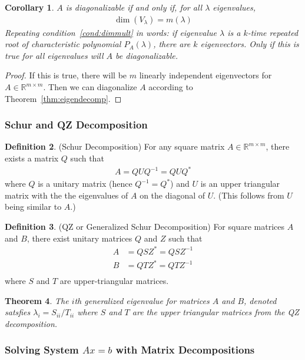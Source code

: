 \documentclass[12pt]{article}
\numberwithin{equation}{section} %
\theoremstyle{plain}
\newtheorem{thm}{Theorem}[section]
\newtheorem{cor}[thm]{Corollary}
\theoremstyle{definition}
\newtheorem{defn}[thm]{Definition}
\theoremstyle{remark}
\newcommand{\Rmm}{\mathbb{R}^{m\times m}}
\begin{document}
\begin{cor}
$A$ is diagonalizable if and only if, for all $\lambda$ eigenvalues,
\begin{align}
  \label{cond:dimmult}
  \dim(V_\lambda)=m(\lambda)
\end{align}
Repeating condition~\ref{cond:dimmult} in words: if eigenvalue $\lambda$
is a $k$-time repeated root of characteristic polynomial $P_A(\lambda)$,
there are $k$ eigenvectors. Only if this is true for all eigenvalues
will $A$ be diagonalizable.
\end{cor}
\begin{proof}
If this is true, there will be $m$ linearly independent eigenvectors for
$A\in \Rmm$. Then we can diagonalize $A$ according to
Theorem~\ref{thm:eigendecomp}.
\end{proof}


\subsubsection{Schur and QZ Decomposition}

\begin{defn}{(Schur Decomposition)}
For any square matrix $A\in\Rmm$, there exists a matrix $Q$ such that
\begin{align*}
  A = Q U Q^{-1} = Q U Q^*
\end{align*}
where $Q$ is a unitary matrix (hence $Q^{-1} = Q^*$) and $U$ is an upper
triangular matrix with the the eigenvalues of $A$ on the diagonal of
$U$. (This follows from $U$ being similar to $A$.)
\end{defn}

\begin{defn}{(QZ or Generalized Schur Decomposition)}
For square matrices $A$ and $B$, there exist unitary matrices $Q$ and
$Z$ such that
\begin{align*}
  A &= Q S Z^* = QSZ^{-1} \\
  B &= Q T Z^* = QTZ^{-1} \\
\end{align*}
where $S$ and $T$ are upper-triangular matrices.
\end{defn}

\begin{thm}
The $i$th generalized eigenvalue for matrices $A$ and $B$, denoted
satsfies $\lambda_i = S_{ii} / T_{ii}$ where $S$ and $T$ are the upper
triangular matrices from the QZ decomposition.
\end{thm}


\clearpage
\subsubsection{Solving System $Ax=b$ with Matrix Decompositions}
\end{document}
